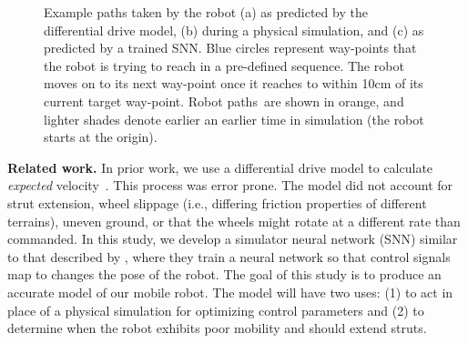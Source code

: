 \begin{figure}[ht]
    \centering
    \hfil
    \hfil
    \caption{Example paths taken by the robot (a) as predicted by the differential drive model, (b) during a physical simulation, and (c) as predicted by a trained SNN. Blue circles represent way-points that the robot is trying to reach in a pre-defined sequence. The robot moves on to its next way-point once it reaches to within 10\si{cm} of its current target way-point. Robot paths are shown in orange, and lighter shades denote earlier an earlier time in simulation (the robot starts at the origin).}
    \label{fig:paths}
\end{figure}

\noindent
\textbf{Related work.}
%
In prior work, we use a differential drive model to calculate \emph{expected} velocity~\citep{Clark.2018.C.EvolvingControllersTransformable}. This process was error prone.
%
The model did not account for strut extension, wheel slippage (i.e., differing friction properties of different terrains), uneven ground, or that the wheels might rotate at a different rate than commanded.
%
In this study, we develop a simulator neural network (SNN) similar to that described by \citet{Pretorius.2014.2ICECC.ComparisonNeuralNetworks}, where they train a neural network so that control signals map to changes the pose of the robot.
%
The goal of this study is to produce an accurate model of our mobile robot. The model will have two uses: (1) to act in place of a physical simulation for optimizing control parameters and (2) to determine when the robot exhibits poor mobility and should extend struts.
